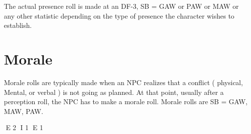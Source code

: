 The actual presence roll is made at an DF-3, SB = GAW or PAW or MAW or
any other statistic depending on the type of presence the character wishes to establish. 

\section{Morale}

Morale rolls are typically made when an NPC realizes that a conflict
( physical, Mental, or verbal ) is not going as planned. At that point,
usually after a perception roll, the NPC has to make a morale roll. 
Morale rolls are SB = GAW, MAW, PAW.



E 2
I 1
E 1
